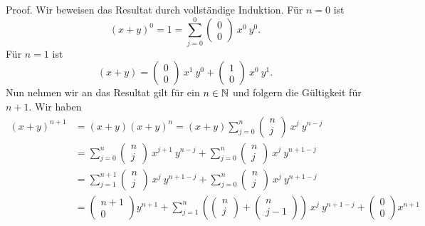 \begin{emphBox}{}{}
Proof.  Wir beweisen das Resultat durch vollständige Induktion. Für \(n=0\) ist
\begin{equation*}
(x+y)^0 = 1 =  \sum_{j=0}^0 (\begin{matrix} 0\\0 \end{matrix} ) ~  x^0~ y^0 .
\end{equation*}
Für \(n=1\) ist
\begin{equation*}
 (x+y) = (\begin{matrix} 0\\0 \end{matrix} ) ~  x^1~ y^0 + (\begin{matrix} 1\\0 \end{matrix} ) ~  x^0~ y^1.
\end{equation*}
Nun nehmen wir an das Resultat gilt für ein \(n \in \mathbb{N}\) und folgern die Gültigkeit für \(n+1\).
Wir haben
\begin{align*}
(x+y)^{n+1} &= (x+y) (x+y)^n =  (x+y) \sum_{j=0}^n (\begin{matrix} n\\j \end{matrix} ) ~  x^j~ y^{n-j} \\
&=\sum_{j=0}^n (\begin{matrix} n\\j \end{matrix} ) ~  x^{j+1}~ y^{n-j} +\sum_{j=0}^n (\begin{matrix} n\\j \end{matrix} ) ~  x^j~ y^{n+1-j}  \\
&= \sum_{j=1}^{n+1} (\begin{matrix} n\\j \end{matrix} ) ~  x^{j}~ y^{n+1-j}  + \sum_{j=0}^n (\begin{matrix} n\\j \end{matrix} ) ~  x^j~ y^{n+1-j} \\
&= (\begin{matrix} n+1\\ 0 \end{matrix} ) y^{n+1}+ \sum_{j=1}^{n } \left( (\begin{matrix} n\\j \end{matrix} ) +  (\begin{matrix} n\\j-1 \end{matrix} ) \right) ~  x^{j}~ y^{n+1-j} + (\begin{matrix} 0\\ 0 \end{matrix} ) x^{n+1}

\end{align*}
\end{emphBox}
